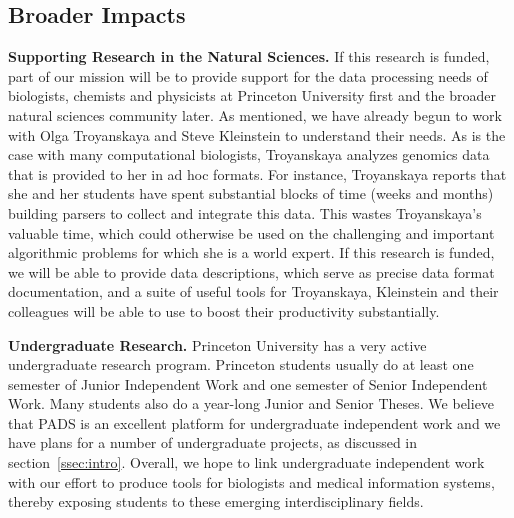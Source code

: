 \documentclass[11pt]{article}
\begin{document}
\subsection{Broader Impacts}
\label{sec:impact}


\noindent
{\bf Supporting Research in the Natural Sciences.}
If this research is funded, part of our mission will be
to provide support for the data processing needs of biologists,
chemists and physicists at Princeton University first and 
the broader natural sciences community later.  As mentioned,
we have already begun to work with Olga Troyanskaya
and Steve Kleinstein to understand their needs.
As is the case with many computational biologists,
Troyanskaya analyzes genomics data that is provided to her in ad hoc
formats.  For instance, Troyanskaya reports that she
and her students have spent
substantial blocks of time (weeks and months)
building parsers to collect and integrate
this data.  This wastes Troyanskaya's valuable time, which could otherwise be
used on the challenging and important algorithmic problems for which
she is a world expert.
If this research is
funded, we will be able to provide data descriptions, which serve as precise
data format
documentation, and a suite of useful tools for Troyanskaya, Kleinstein
and their colleagues will be able to use to boost their productivity
substantially.  



\noindent
{\bf Undergraduate Research.}
Princeton University has a very active undergraduate research program.
Princeton students usually do at least one semester of
Junior Independent Work and one semester of Senior Independent Work. 
Many students also do a year-long
Junior and Senior Theses.  We believe that PADS is an excellent
platform for undergraduate independent work and we have plans for
a number of undergraduate projects, as discussed in 
section~\ref{ssec:intro}.  Overall, we hope to link
undergraduate independent work with our effort to
produce tools for biologists and medical information systems,
thereby exposing students to these emerging interdisciplinary fields.
\end{document}
